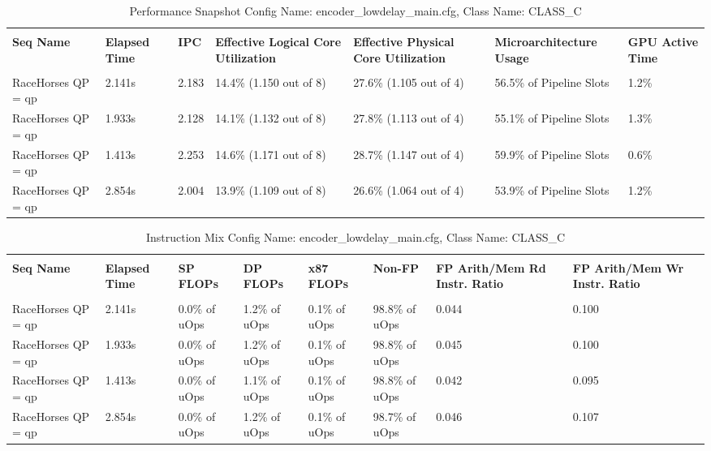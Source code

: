 \documentclass{article}%
\begin{document}
\begin{longtabu}{| X[l] | X[l] | X[l] | X[l] | X[l] | X[l] | X[l] |}%
\caption{%
Performance Snapshot\newline%
 Config Name: encoder\_lowdelay\_main.cfg,\newline%
 Class Name: CLASS\_C\newline%
%
}%
\hline%
&&&&&&\\%
\textbf{Seq Name}&\textbf{Elapsed Time}&\textbf{IPC}&\textbf{Effective Logical Core Utilization}&\textbf{Effective Physical Core Utilization}&\textbf{Microarchitecture Usage}&\textbf{GPU Active Time}\\%
&&&&&&\\%
\hline%
\endhead%
RaceHorses\newline%
 QP = qp&2.141s&2.183&14.4\% (1.150 out of 8)&27.6\% (1.105 out of 4)&56.5\% of Pipeline Slots&1.2\%\\%
\hline%
RaceHorses\newline%
 QP = qp&1.933s&2.128&14.1\% (1.132 out of 8)&27.8\% (1.113 out of 4)&55.1\% of Pipeline Slots&1.3\%\\%
\hline%
RaceHorses\newline%
 QP = qp&1.413s&2.253&14.6\% (1.171 out of 8)&28.7\% (1.147 out of 4)&59.9\% of Pipeline Slots&0.6\%\\%
\hline%
RaceHorses\newline%
 QP = qp&2.854s&2.004&13.9\% (1.109 out of 8)&26.6\% (1.064 out of 4)&53.9\% of Pipeline Slots&1.2\%\\%
\hline%
\end{longtabu}%
\begin{longtabu}{| X[l] | X[l] | X[l] | X[l] | X[l] | X[l] | X[l] | X[l] |}%
\caption{%
Instruction Mix\newline%
 Config Name: encoder\_lowdelay\_main.cfg,\newline%
 Class Name: CLASS\_C\newline%
%
}%
\hline%
&&&&&&&\\%
\textbf{Seq Name}&\textbf{Elapsed Time}&\textbf{SP FLOPs}&\textbf{DP FLOPs}&\textbf{x87 FLOPs}&\textbf{Non{-}FP}&\textbf{FP Arith/Mem Rd Instr. Ratio}&\textbf{FP Arith/Mem Wr Instr. Ratio}\\%
&&&&&&&\\%
\hline%
\endhead%
RaceHorses\newline%
 QP = qp&2.141s&0.0\% of uOps&1.2\% of uOps&0.1\% of uOps&98.8\% of uOps&0.044&0.100\\%
\hline%
RaceHorses\newline%
 QP = qp&1.933s&0.0\% of uOps&1.2\% of uOps&0.1\% of uOps&98.8\% of uOps&0.045&0.100\\%
\hline%
RaceHorses\newline%
 QP = qp&1.413s&0.0\% of uOps&1.1\% of uOps&0.1\% of uOps&98.8\% of uOps&0.042&0.095\\%
\hline%
RaceHorses\newline%
 QP = qp&2.854s&0.0\% of uOps&1.2\% of uOps&0.1\% of uOps&98.7\% of uOps&0.046&0.107\\%
\hline%
\end{longtabu}%
\end{document}
